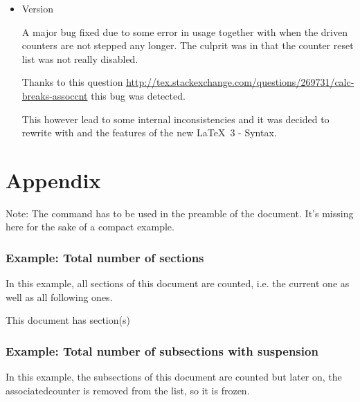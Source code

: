 \documentclass[12pt,a4paper,oneside]{article}
\makeatletter
\newcommand{\chdocextractversion}[1]{%
  \@nameuse{#1}%
}
\newcommand{\CHDocFullVersion}[1]{Version \chdocextractversion{xassoccntversion#1}}
\makeatother
\begin{document}
\begin{itemize}[itemsep=15pt]
\item 
\CHDocFullVersion{0.1}

  A major bug fixed due to some error in usage together with  when the driven counters are not stepped any longer. 
  The culprit was in  that the counter reset list was not really disabled. 
  
  Thanks to this question \url{http://tex.stackexchange.com/questions/269731/calc-breaks-assoccnt} this bug was detected. 
  
  This however lead to some internal inconsistencies and it was decided to rewrite  with  and the features of the new \LaTeX\ 3 - Syntax. 
  
\end{itemize}
\clearpage
{}
\part{Appendix}\label{examplesappendix}
\setcounter{section}{0}
\renewcommand{\theHsection}{appendix.\thesection}
\renewcommand{\thesection}{\Alph{section}}

Note: The  command has to be used in the preamble of the document. It's missing here for the sake of a compact example. 



\section[Total number of sections]{Example: Total number of sections}
In this example, all sections of this document are counted, i.e. the current one as well as all following ones.
\begin{dispExample}
This document has  section(s)%
\end{dispExample}



\section[Subsection with suspension]{Example: Total number of subsections with suspension}

In this example, the subsections of this document are counted but later on, the associatedcounter is removed from the list, so it is frozen.
\end{document}
